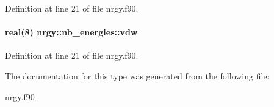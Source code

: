 Definition at line 21 of file nrgy.\-f90.

\hypertarget{structnrgy_1_1nb__energies_a3009270d254606521618e9ae88e6538d}{
\paragraph[{vdw}]{\setlength{\rightskip}{0pt plus 5cm}real(8) nrgy\-::nb\-\_\-energies\-::vdw}}\label{structnrgy_1_1nb__energies_a3009270d254606521618e9ae88e6538d}


Definition at line 21 of file nrgy.\-f90.



The documentation for this type was generated from the following file\-:\begin{DoxyCompactItemize}
\item 
\hyperlink{nrgy_8f90}{nrgy.\-f90}\end{DoxyCompactItemize}
